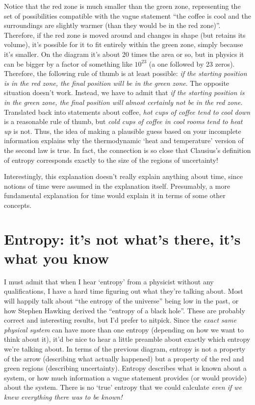 \documentclass[a4paper, 12pt]{article}
\begin{document}
Notice that the red zone is much smaller than the green zone,
representing the set of possibilities compatible with the vague statement
``the coffee is cool and the surroundings are slightly warmer (than they
would be in the red zone)''. Therefore, if the red zone is moved around and
changes in shape (but retains its volume), it's possible for it to fit entirely
within the green zone, simply because it's smaller.
On the diagram it's about 20 times the area or so,
but in physics it can be bigger by a factor of something like $10^{23}$
(a one followed by 23 zeros). Therefore, the following rule of thumb is at least
possible: {\em if the starting position is in the red zone, the final position
will be in the green zone}. The opposite situation doesn't work. Instead, we
have to admit that
{\em if the starting position is in the green zone, the final position will
almost certainly not be in the red zone}. Translated back into statements about
coffee, {\em hot cups of coffee tend to cool down} is a reasonable rule of
thumb, but {\em cold cups of coffee in cool rooms tend to heat up} is not.
Thus, the idea of making a plausible guess based on your incomplete information
explains why the thermodynamic `heat and temperature' version of the
second law is true. In fact, the connection is so close that
Clausius's definition of entropy corresponds exactly to the size of the
regions of uncertainty!

Interestingly, this explanation doesn't really explain anything about time,
since notions of time were assumed in the explanation itself. Presumably,
a more fundamental explanation for time would explain it in terms of some
other concepts.

\section*{Entropy: it's not what's there, it's what you know}
I must admit that when I hear `entropy' from a physicist without any
qualifications, I have a hard time figuring out what they're talking about.
Most will
happily talk about ``the entropy of the universe'' being low in the past,
or how Stephen Hawking derived the ``entropy of a black hole''. These are
probably correct and interesting results, but I'd prefer to nitpick.
Since the {\em exact same physical system}
can have more than one entropy (depending on how we want to think about it),
it'd be nice to hear a little preamble about exactly which entropy we're
talking about.
In terms of the previous diagram, entropy is not a property of the arrow
(describing what actually happened) but a property of the red and green regions
(describing uncertainty).
Entropy describes what is known about a system, or how much information a
vague statement provides (or would provide) about the system.
There is no `true' entropy that
we could calculate {\em even if we knew everything there was to be known!}
\end{document}
